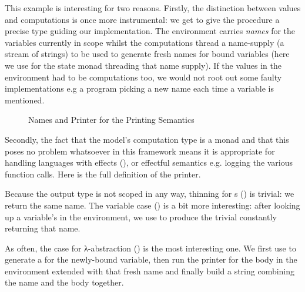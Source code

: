This example is interesting for two reasons. Firstly, the distinction between
values and computations is once more instrumental: we get to give the procedure
a precise type guiding our implementation. The environment carries \emph{names}
for the variables currently in scope whilst the computations thread a name-supply
(a stream of strings) to be used to generate fresh names for bound variables
(here we use  for the state monad threading that name supply).
If the values in the environment had to be computations too, we would not root
out some faulty implementations e.g a program picking a new name each time a
variable is mentioned.

\begin{figure}[h]
\begin{minipage}{0.5\textwidth}
\end{minipage}
\begin{minipage}{0.5\textwidth}
\end{minipage}
\caption{Names and Printer for the Printing Semantics\label{fig:semprint}}
\end{figure}

Secondly, the fact that the model's computation type is a monad and that this
poses no problem whatsoever in this framework means it is appropriate for
handling languages with effects (\cite{moggi1991notions}), or effectful
semantics e.g. logging the various function calls. Here is the full definition
of the printer.


Because the output type is not scoped in any way, thinning for s
() is trivial: we return the same name. The variable
case () is a bit more interesting: after looking up a variable's 
in the environment, we use  to produce the trivial  constantly
returning that name.


As often, the case for λ-abstraction () is the most interesting one.
We first use  to generate a  for the newly-bound variable,
then run the printer for the body in the environment extended with that fresh
name and finally build a string combining the name and the body together.


